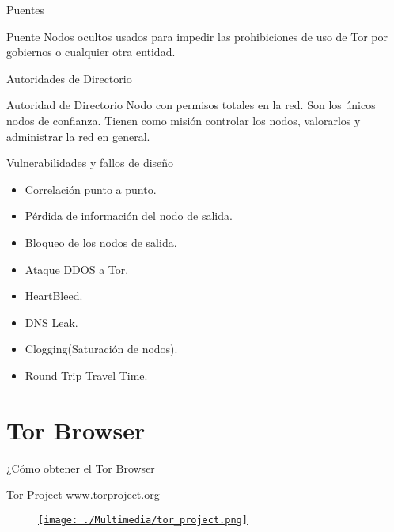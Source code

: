 \documentclass[10pt]{beamer}
\begin{document}
\begin{frame}[fragile]{Puentes}
	\pause
	\begin{block}{Puente}
		Nodos ocultos usados para impedir las prohibiciones de uso de Tor por gobiernos o cualquier otra entidad.
	\end{block}
\end{frame}

\begin{frame}[fragile]{Autoridades de Directorio}
	\pause
	\begin{block}{Autoridad de Directorio}
		Nodo con permisos totales en la red. Son los únicos nodos de confianza. Tienen como misión controlar los nodos, valorarlos y administrar la red en general.
	\end{block}
\end{frame}

\begin{frame}[fragile]{Vulnerabilidades y fallos de diseño}
	\pause
	\begin{itemize}
		\item<1-> Correlación punto a punto.\pause
		\item<2-> Pérdida de información del nodo de salida.\pause
		\item<3-> Bloqueo de los nodos de salida.\pause
		\item<4-> Ataque DDOS a Tor.\pause
		\item<5-> HeartBleed.\pause
		\item<6-> DNS Leak.\pause
		\item<7-> Clogging(Saturación de nodos).\pause
		\item<8-> Round Trip Travel Time.\pause
	\end{itemize}
\end{frame}

\section{Tor Browser}

\begin{frame}{¿Cómo obtener el Tor Browser}
	\pause
	\begin{block}{Tor Project}
		www.torproject.org
	\end{block}
	
	\begin{figure}
		\centering
		\href{http://www.torproject.org}{\texttt{[image: ./Multimedia/tor\_project.png]}}
	\end{figure}
\end{frame}
\end{document}
